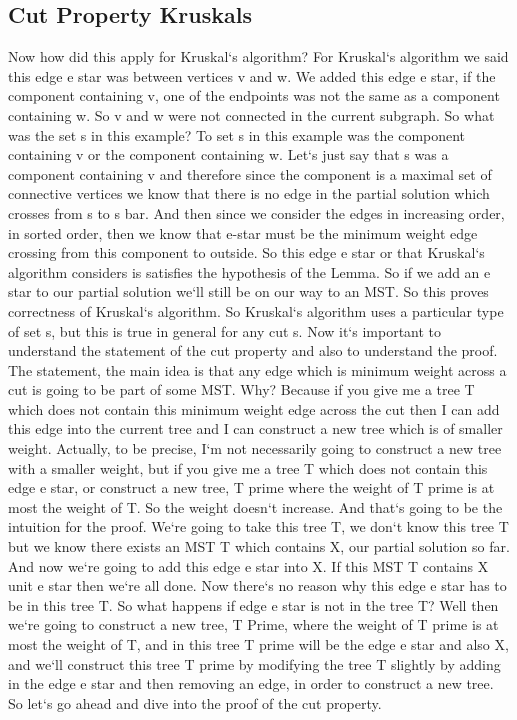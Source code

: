 \subsection{Cut Property  Kruskals}
Now how did this apply for Kruskal`s algorithm? For Kruskal`s algorithm we said this edge e star was between vertices v and w.
We added this edge e star, if the component containing v, one of the endpoints was not the same as a component containing w.
So v and w were not connected in the current subgraph.
So what was the set s in this example? To set s in this example was the component containing v or the component containing w.
Let`s just say that s was a component containing v and therefore since the component is a maximal set of connective vertices we know that there is no edge in the partial solution which crosses from s to s bar.
And then since we consider the edges in increasing order, in sorted order, then we know that e-star must be the minimum weight edge crossing from this component to outside.
So this edge e star or that Kruskal`s algorithm considers is satisfies the hypothesis of the Lemma.
So if we add an e star to our partial solution we`ll still be on our way to an MST\@.
So this proves correctness of Kruskal`s algorithm.
So Kruskal`s algorithm uses a particular type of set s, but this is true in general for any cut s.
Now it`s important to understand the statement of the cut property and also to understand the proof.
The statement, the main idea is that any edge which is minimum weight across a cut is going to be part of some MST\@.
Why? Because if you give me a tree T which does not contain this minimum weight edge across the cut then I can add this edge into the current tree and I can construct a new tree which is of smaller weight.
Actually, to be precise, I`m not necessarily going to construct a new tree with a smaller weight, but if you give me a tree T which does not contain this edge e star, or construct a new tree, T prime where the weight of T prime is at most the weight of T\@.
So the weight doesn`t increase.
And that`s going to be the intuition for the proof.
We`re going to take this tree T, we don`t know this tree T but we know there exists an MST T which contains X, our partial solution so far.
And now we`re going to add this edge e star into X\@.
If this MST T contains X unit e star then we`re all done.
Now there`s no reason why this edge e star has to be in this tree T\@.
So what happens if edge e star is not in the tree T? Well then we`re going to construct a new tree, T Prime, where the weight of T prime is at most the weight of T, and in this tree T prime will be the edge e star and also X, and we`ll construct this tree T prime by modifying the tree T slightly by adding in the edge e star and then removing an edge, in order to construct a new tree.
So let`s go ahead and dive into the proof of the cut property.

